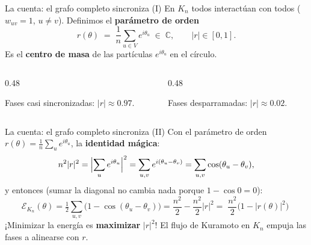 \documentclass[10pt,aspectratio=169]{beamer}
\newcommand{\E}{\mathcal{E}}
\begin{document}
\begin{frame}{La cuenta: el grafo completo sincroniza (I)}
En $K_n$ todos interactúan con todos ($w_{uv}=1$, $u\ne v$). Definimos el \textbf{parámetro de orden}
\[
r(\theta) \;=\; \frac{1}{n}\sum_{u\in V} e^{i\theta_u} \;\in\; \mathbb{C},
\qquad |r| \in [0,1].
\]
Es el \textbf{centro de masa} de las partículas $e^{i\theta_u}$ en el círculo.
\pause
\medskip

\begin{columns}[T]
\begin{column}{0.48\textwidth}
\centering
{}

\small Fases casi sincronizadas: $|r| \approx 0{.}97$.
\end{column}
\pause
\begin{column}{0.48\textwidth}
\centering
{}

\small Fases desparramadas: $|r| \approx 0{.}02$.
\end{column}
\end{columns}
\end{frame}

\begin{frame}{La cuenta: el grafo completo sincroniza (II)}
Con el parámetro de orden $r(\theta) = \frac{1}{n}\sum_{u} e^{i\theta_u}$, la \textbf{identidad mágica}:
\[
n^2 |r|^2 = \Bigl|\sum_u e^{i\theta_u}\Bigr|^2
= \sum_{u,v} e^{i(\theta_u-\theta_v)}
= \sum_{u,v} \cos(\theta_u-\theta_v),
\]
\pause
y entonces (sumar la diagonal no cambia nada porque $1-\cos 0 = 0$):
\[
\E_{K_n}(\theta) = \tfrac12\sum_{u,v}\bigl(1-\cos(\theta_u-\theta_v)\bigr)
= \frac{n^2}{2} - \frac{n^2}{2}|r|^2
= \boxed{\;\frac{n^2}{2}\bigl(1-|r(\theta)|^2\bigr)\;}
\]
\medskip
¡Minimizar la energía es \textbf{maximizar} $|r|^2$! El flujo de Kuramoto en $K_n$ empuja las fases a alinearse con $r$.
\end{frame}
\end{document}
